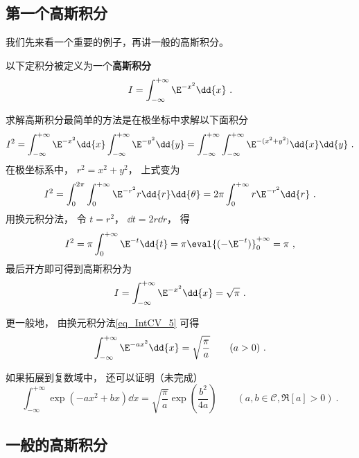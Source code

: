 

\subsection{第一个高斯积分}

我们先来看一个重要的例子，再讲一般的高斯积分。

以下定积分被定义为一个\textbf{高斯积分}
\begin{equation}
I = \int_{-\infty}^{+\infty} \E^{-x^2}\dd{x}~.
\end{equation}

求解高斯积分最简单的方法是在极坐标中求解以下面积分
\begin{equation}
I^2 = \int_{-\infty}^{+\infty} \E^{-x^2}\dd{x} \int_{-\infty}^{+\infty} \E^{-y^2}\dd{y}
=\int_{-\infty}^{+\infty}\int_{-\infty}^{+\infty} \E^{-(x^2 + y^2)} \dd{x}\dd{y}~.
\end{equation}
在极坐标系中， $r^2 = x^2 + y^2$， 上式变为
\begin{equation}
I^2 = \int_0^{2\pi} \int_0^{+\infty} \E^{-r^2} r\dd{r}\dd{\theta}
= 2\pi \int_0^{+\infty} r\E^{-r^2} \dd{r}~.
\end{equation}
用换元积分法， 令 $t = r^2$， $\dd{t} = 2r\dd{r}$， 得
\begin{equation}
I^2 = \pi \int_0^{+\infty} \E^{-t} \dd{t} = \pi \eval{(-\E^{-t})}_0^{+\infty} = \pi~,
\end{equation}
最后开方即可得到高斯积分为
\begin{equation}\label{eq_GsInt_1}
I = \int_{-\infty}^{+\infty} \E^{-x^2}\dd{x} = \sqrt{\pi}~.
\end{equation}

更一般地， 由换元积分法\autoref{eq_IntCV_5}  可得
\begin{equation}\label{eq_GsInt_5}
\int_{-\infty}^{+\infty} \E^{-a x^2}\dd{x} = \sqrt{\frac{\pi}{a}} \qquad (a > 0)~.
\end{equation}

如果拓展到复数域中， 还可以证明（未完成）
\begin{equation}\label{eq_GsInt_4}
\int_{-\infty}^{+\infty} \exp(-ax^2 + bx) \dd{x} = \sqrt{\frac{\pi}{a}} \exp(\frac{b^2}{4a}) \qquad (a, b\in \mathcal C, \Re[a] > 0)~.
\end{equation}


\subsection{一般的高斯积分}

